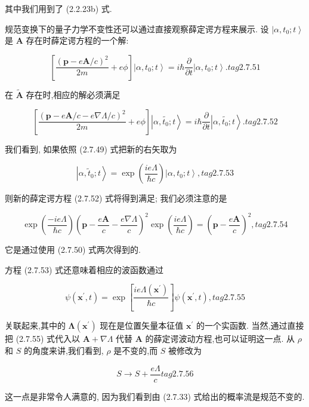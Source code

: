 \documentclass[lang=cn,newtx,10pt,scheme=chinese,thmcnt=section]{elegantbook}
\begin{document}
其中我们用到了 (2.2.23b) 式.

规范变换下的量子力学不变性还可以通过直接观察薛定谔方程来展示. 设 $\left| {\alpha ,{t}_{0};t}\right\rangle$ 是 $\mathbf{A}$ 存在时薛定谔方程的一个解:

$$
\left\lbrack {\frac{{\left( \mathbf{p} - e\mathbf{A}/c\right) }^{2}}{2m} + {e\phi }}\right\rbrack \left| {\alpha ,{t}_{0};t}\right\rangle = i\hbar \frac{\partial }{\partial t}\left| {\alpha ,{t}_{0};t}\right\rangle . tag{2. 7.51}
$$

在 $\widetilde{\mathbf{A}}$ 存在时,相应的解必须满足

$$
\left\lbrack {\frac{{\left( \mathbf{p} - e\mathbf{A}/c - e\nabla \Lambda /c\right) }^{2}}{2m} + {e\phi }}\right\rbrack \left| {\alpha ,\widetilde{{t}_{0}};t}\right\rangle = i\hbar \frac{\partial }{\partial t}\left| {\alpha ,\widetilde{{t}_{0}};t}\right\rangle . tag{2. 7.52}
$$

我们看到, 如果依照 (2.7.49) 式把新的右矢取为

$$
\left| {\alpha ,{\widetilde{t}}_{0};t}\right\rangle = \exp \left( \frac{ie\Lambda }{\hbar c}\right) \left| {\alpha ,{t}_{0};t}\right\rangle , tag{2. 7.53}
$$

则新的薛定谔方程 (2.7.52) 式将得到满足; 我们必须注意的是

$$
\exp \left( \frac{-{ie\Lambda }}{\hbar c}\right) {\left( \mathbf{p} - \frac{e\mathbf{A}}{c} - \frac{e\nabla \Lambda }{c}\right) }^{2}\exp \left( \frac{ie\Lambda }{\hbar c}\right) = {\left( \mathbf{p} - \frac{e\mathbf{A}}{c}\right) }^{2}, tag{2. 7.54}
$$

它是通过使用 (2.7.50) 式两次得到的.

方程 (2.7.53) 式还意味着相应的波函数通过

$$
\psi \left( {{\mathbf{x}}^{\prime }, t}\right) = \exp \left\lbrack \frac{{ie\Lambda }\left( {\mathbf{x}}^{\prime }\right) }{\hbar c}\right\rbrack \psi \left( {{\mathbf{x}}^{\prime }, t}\right) , tag{2. 7.55}
$$

关联起来,其中的 $\mathbf{\Lambda }\left( {\mathbf{x}}^{\prime }\right)$ 现在是位置矢量本征值 ${\mathbf{x}}^{\prime }$ 的一个实函数. 当然,通过直接把 (2.7.55) 式代入以 $\mathbf{A} + \nabla \Lambda$ 代替 $\mathbf{A}$ 的薛定谔波动方程,也可以证明这一点. 从 $\rho$ 和 $S$ 的角度来讲,我们看到, $\rho$ 是不变的,而 $S$ 被修改为

$$
S \rightarrow S + \frac{e\Lambda }{c} tag{2.7.56}
$$

这一点是非常令人满意的, 因为我们看到由 (2.7.33) 式给出的概率流是规范不变的.
\end{document}
